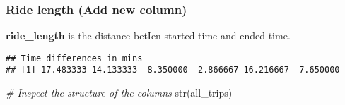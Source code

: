 \documentclass[
]{article}
\newenvironment{Shaded}{\begin{snugshade}}{\end{snugshade}}
\newcommand{\AttributeTok}[1]{\textcolor[rgb]{0.77,0.63,0.00}{#1}}
\newcommand{\CommentTok}[1]{\textcolor[rgb]{0.56,0.35,0.01}{\textit{#1}}}
\newcommand{\FunctionTok}[1]{\textcolor[rgb]{0.00,0.00,0.00}{#1}}
\newcommand{\NormalTok}[1]{#1}
\newcommand{\OtherTok}[1]{\textcolor[rgb]{0.56,0.35,0.01}{#1}}
\newcommand{\SpecialCharTok}[1]{\textcolor[rgb]{0.00,0.00,0.00}{#1}}
\newcommand{\StringTok}[1]{\textcolor[rgb]{0.31,0.60,0.02}{#1}}
\begin{document}
\hypertarget{ride-length-add-new-column}{%
\subsubsection{Ride length (Add new
column)}\label{ride-length-add-new-column}}

\textbf{ride\_length} is the distance betIen started time and ended
time.

\begin{Shaded}
\end{Shaded}

\begin{verbatim}
## Time differences in mins
## [1] 17.483333 14.133333  8.350000  2.866667 16.216667  7.650000
\end{verbatim}

\begin{Shaded}
\begin{Highlighting}[]
\CommentTok{\# Inspect the structure of the columns}
\FunctionTok{str}\NormalTok{(all\_trips)}
\end{Highlighting}
\end{Shaded}
\end{document}
